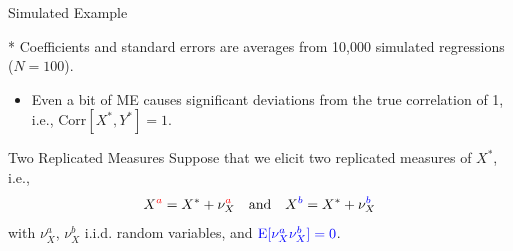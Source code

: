 \begin{frame}{Simulated Example}
    \begin{table}[]
\centering
\label{tab:risk}
\end{table}
\small{\color{blue}* Coefficients and standard errors are averages from 10,000 simulated regressions ($N=100$).}
\begin{itemize}
    \item[$\implies$] Even a bit of ME causes significant deviations from the true correlation of 1, i.e., $\text{Corr}[X^{*},Y^{*}]=1$.
\end{itemize}
\end{frame}

\begin{frame}{Two Replicated Measures}
    Suppose that we elicit two replicated measures of $X^{*}$, i.e.,
    \[
    X^{{\color{red}a}}=X^{*}+\nu_{X}^{{\color{red}a}} \quad \text{and} \quad X^{{\color{blue}b}}=X^{*}+\nu_{X}^{{\color{blue}b}}
    \]
    with $\nu_{X}^{a}$, $\nu_{X}^{b}$ i.i.d. random variables, and ${\color{blue}\text{E}[\nu_{X}^{a}\nu_{X}^{b}]=0}$.
\end{frame}

